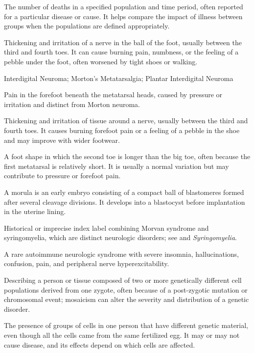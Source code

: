  The number of deaths in a specified population and time period, often reported for a particular disease or cause. It helps compare the impact of illness between groups when the populations are defined appropriately.

 Thickening and irritation of a nerve in the ball of the foot, usually between the third and fourth toes. It can cause burning pain, numbness, or the feeling of a pebble under the foot, often worsened by tight shoes or walking.

\synonyms
Interdigital Neuroma; Morton's Metatarsalgia; Plantar Interdigital Neuroma

 Pain in the forefoot beneath the metatarsal heads, caused by pressure or irritation and distinct from Morton neuroma.

 Thickening and irritation of tissue around a nerve, usually between the third and fourth toes. It causes burning forefoot pain or a feeling of a pebble in the shoe and may improve with wider footwear.

 A foot shape in which the second toe is longer than the big toe, often because the first metatarsal is relatively short. It is usually a normal variation but may contribute to pressure or forefoot pain.

 A morula is an early embryo consisting of a compact ball of blastomeres formed after several cleavage divisions. It develops into a blastocyst before implantation in the uterine lining.

 Historical or imprecise index label combining Morvan syndrome and syringomyelia, which are distinct neurologic disorders; see  and \textit{Syringomyelia}.

 A rare autoimmune neurologic syndrome with severe insomnia, hallucinations, confusion, pain, and peripheral nerve hyperexcitability.

 Describing a person or tissue composed of two or more genetically different cell populations derived from one zygote, often because of a post-zygotic mutation or chromosomal event; mosaicism can alter the severity and distribution of a genetic disorder.

 The presence of groups of cells in one person that have different genetic material, even though all the cells came from the same fertilized egg. It may or may not cause disease, and its effects depend on which cells are affected.

